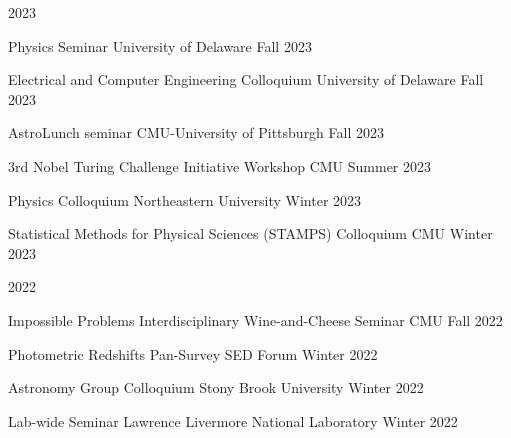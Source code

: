 \documentclass[11pt,letterpaper]{article}
\begin{document}
\nopagebreak\begin{list}{}{\malzlist}
	\item 2023
	\nopagebreak\begin{list}{}{\malzlist}
		\item {}
		{Physics Seminar}
		{University of Delaware}
		{Fall 2023}
		\item {}
		{Electrical and Computer Engineering Colloquium}
		{University of Delaware}
		{Fall 2023}
		\item {}
		{AstroLunch seminar}
		{CMU-University of Pittsburgh}
		{Fall 2023}
		\item {}
		{3rd Nobel Turing Challenge Initiative Workshop}
		{CMU}
		{Summer 2023}
		\item {}
		{Physics Colloquium}
		{Northeastern University}
		{Winter 2023}
		\item {}
		{Statistical Methods for Physical Sciences (STAMPS) Colloquium}
		{CMU}
		{Winter 2023}
	\end{list}
	\item 2022
	\nopagebreak\begin{list}{}{\malzlist}
		\item {}
		{Impossible Problems Interdisciplinary Wine-and-Cheese Seminar}
		{CMU}
		{Fall 2022}
		\item {}
		{Photometric Redshifts}
		{Pan-Survey SED Forum}
		{Winter 2022}
		\item {}
		{Astronomy Group Colloquium}
		{Stony Brook University}
		{Winter 2022}
		\item {}
		{Lab-wide Seminar}
		{Lawrence Livermore National Laboratory}
		{Winter 2022}

\end{list}
\end{list}
\end{document}
